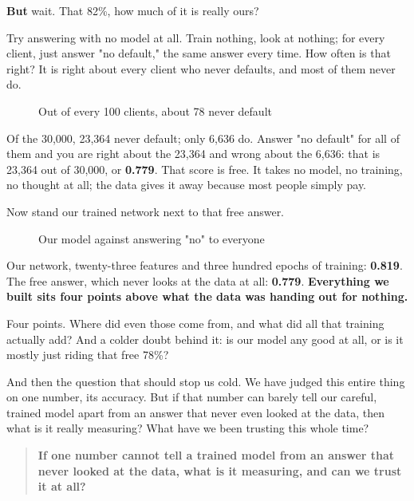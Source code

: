 \documentclass[11pt]{article} %
\begin{document}
\textbf{But} wait. That 82\%, how much of it is really ours?

Try answering with no model at all. Train nothing, look at nothing; for every client, just answer "no default," the same answer every time. How often is that right? It is right about every client who never defaults, and most of them never do.

\begin{figure}[htbp]
\centering

\caption{Out of every 100 clients, about 78 never default}
\end{figure}


Of the 30,000, 23,364 never default; only 6,636 do. Answer "no default" for all of them and you are right about the 23,364 and wrong about the 6,636: that is 23,364 out of 30,000, or \textbf{0.779}. That score is free. It takes no model, no training, no thought at all; the data gives it away because most people simply pay.

Now stand our trained network next to that free answer.

\begin{figure}[htbp]
\centering

\caption{Our model against answering "no" to everyone}
\end{figure}


Our network, twenty-three features and three hundred epochs of training: \textbf{0.819}. The free answer, which never looks at the data at all: \textbf{0.779}. \textbf{Everything we built sits four points above what the data was handing out for nothing.}

Four points. Where did even those come from, and what did all that training actually add? And a colder doubt behind it: is our model any good at all, or is it mostly just riding that free 78\%?

And then the question that should stop us cold. We have judged this entire thing on one number, its accuracy. But if that number can barely tell our careful, trained model apart from an answer that never even looked at the data, then what is it really measuring? What have we been trusting this whole time?


\begin{quote}
\textbf{If one number cannot tell a trained model from an answer that never looked at the data, what is it measuring, and can we trust it at all?}
\end{quote}
\end{document}
